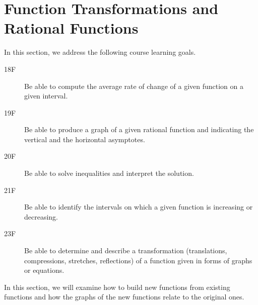 \documentclass[10pt,]{article}
\theoremstyle{plain}
\theoremstyle{definition}
\numberwithin{equation}{section}
\begin{document}
\section[{Function Transformations and Rational Functions}]{Function Transformations and Rational Functions}\label{section-misc}
\hypertarget{p-92}{}%
In this section, we address the following course learning goals.%
\leavevmode%
\begin{description}
\item[{18F}]\hypertarget{li-184}{}\hypertarget{p-93}{}%
Be able to compute the average rate of change of a given function on a given interval.%
\item[{19F}]\hypertarget{li-185}{}\hypertarget{p-94}{}%
Be able to produce a graph of a given rational function and indicating the vertical and the horizontal asymptotes.%
\item[{20F}]\hypertarget{li-186}{}\hypertarget{p-95}{}%
Be able to solve inequalities and interpret the solution.%
\item[{21F}]\hypertarget{li-187}{}\hypertarget{p-96}{}%
Be able to identify the intervals on which a given function is increasing or decreasing.%
\item[{23F}]\hypertarget{li-188}{}\hypertarget{p-97}{}%
Be able to determine and describe a transformation (translations, compressions, stretches, reflections) of a function given in forms of graphs or equations.%
\end{description}
\hypertarget{p-98}{}%
In this section, we will examine how to build new functions from existing functions and how the graphs of the new functions relate to the original ones.%
\end{document}
